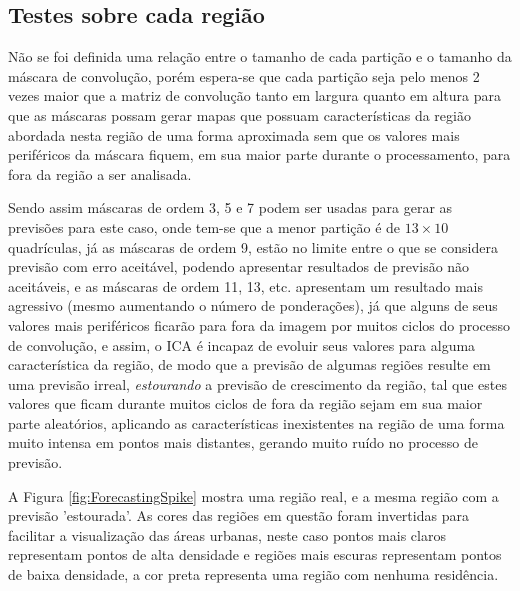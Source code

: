 \subsection{Testes sobre cada região}
\label{Exp:Testes sobre cada região}

Não se foi definida uma relação entre o tamanho de cada partição e o tamanho da máscara de convolução, porém espera-se que cada partição seja pelo menos 2 vezes maior que a matriz de convolução tanto em largura quanto em altura para que as máscaras possam gerar mapas que possuam características da região abordada nesta região de uma forma aproximada sem que os valores mais periféricos da máscara fiquem, em sua maior parte durante o processamento, para fora da região a ser analisada. 

Sendo assim máscaras de ordem 3, 5 e 7 podem ser usadas para gerar as previsões para este caso, onde tem-se que a menor partição é de \(13 \times 10\) quadrículas, já as máscaras  de ordem 9, estão no limite entre o que se considera previsão com erro aceitável, podendo apresentar resultados de previsão não aceitáveis, e as máscaras de ordem 11, 13, etc. apresentam um resultado mais agressivo (mesmo aumentando o número de ponderações), já que alguns de seus valores mais periféricos ficarão para fora da imagem por muitos ciclos do processo de convolução, e assim, o ICA é incapaz de evoluir seus valores para alguma característica da região, de modo que a previsão de algumas regiões resulte em uma previsão irreal, \emph{estourando} a previsão de crescimento da região, tal que estes valores que ficam durante muitos ciclos de fora da região sejam em sua maior parte aleatórios, aplicando as características inexistentes na região de uma forma muito intensa em pontos mais distantes, gerando muito ruído no processo de previsão. 

A Figura \ref{fig:ForecastingSpike} mostra uma região real, e a mesma região com a previsão 'estourada'. As cores das regiões em questão foram invertidas para facilitar a visualização das áreas urbanas, neste caso pontos mais claros representam pontos de alta densidade e regiões mais escuras representam pontos de baixa densidade, a cor preta representa uma região com nenhuma residência.

